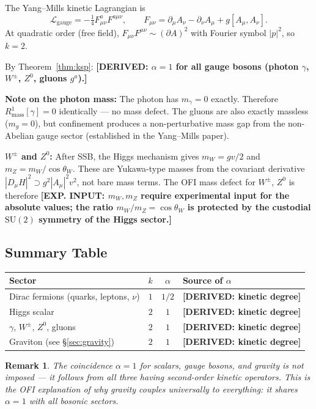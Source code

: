 \documentclass[12pt]{article}
\newtheorem{remark}[theorem]{Remark}
\theoremstyle{definition}
\newcommand{\abs}[1]{\left|#1\right|}
\newcommand{\DERIVED}[1]{\textcolor{derivedcolor}{\textbf{[DERIVED: #1]}}}
\newcommand{\INPUT}[1]{\textcolor{inputcolor}{\textbf{[EXP. INPUT: #1]}}}
\begin{document}
The Yang--Mills kinetic Lagrangian is
\begin{equation}
  \mathcal{L}_{\mathrm{gauge}}
  = -\tfrac{1}{4}F_{\mu\nu}^a F^{a\mu\nu},
  \qquad
  F_{\mu\nu} = \partial_\mu A_\nu - \partial_\nu A_\mu + g[A_\mu,A_\nu].
\end{equation}
At quadratic order (free field), $F_{\mu\nu}F^{\mu\nu} \sim
(\partial A)^2$ with Fourier symbol $\abs{p}^2$, so $k=2$.

By Theorem~\ref{thm:ksp}: \DERIVED{$\alpha = 1$ for all gauge bosons
(photon $\gamma$, $W^\pm$, $Z^0$, gluons $g^a$).}

\textbf{Note on the photon mass:} The photon has $m_\gamma = 0$ exactly.
Therefore $R^1_{\mathrm{mass}}[\gamma] = 0$ identically — no mass defect.
The gluons are also exactly massless ($m_g = 0$), but confinement produces
a non-perturbative mass gap from the non-Abelian gauge sector (established
in the Yang--Mills paper).

\textbf{$W^\pm$ and $Z^0$:} After SSB, the Higgs mechanism gives
$m_W = gv/2$ and $m_Z = m_W/\cos\theta_W$.  These are Yukawa-type
masses from the covariant derivative $\abs{D_\mu H}^2 \supset
g^2\abs{A_\mu}^2 v^2$, not bare mass terms.  The OFI mass defect for
$W^\pm$, $Z^0$ is therefore \INPUT{$m_W, m_Z$ require experimental input
for the absolute values; the ratio $m_W/m_Z = \cos\theta_W$ is protected
by the custodial $\mathrm{SU}(2)$ symmetry of the Higgs sector.}

\subsection{Summary Table}

\begin{center}
\begin{tabular}{lccl}
\toprule
Sector & $k$ & $\alpha$ & Source of $\alpha$ \\
\midrule
Dirac fermions (quarks, leptons, $\nu$) & $1$ & $1/2$ & \DERIVED{kinetic degree} \\
Higgs scalar & $2$ & $1$ & \DERIVED{kinetic degree} \\
$\gamma$, $W^\pm$, $Z^0$, gluons & $2$ & $1$ & \DERIVED{kinetic degree} \\
Graviton (see §\ref{sec:gravity}) & $2$ & $1$ & \DERIVED{kinetic degree} \\
\bottomrule
\end{tabular}
\end{center}

\begin{remark}
The coincidence $\alpha=1$ for scalars, gauge bosons, \emph{and} gravity
is not imposed — it follows from all three having second-order kinetic
operators.  This is the OFI explanation of why gravity couples universally
to everything: it shares $\alpha=1$ with all bosonic sectors.
\end{remark}
\end{document}
